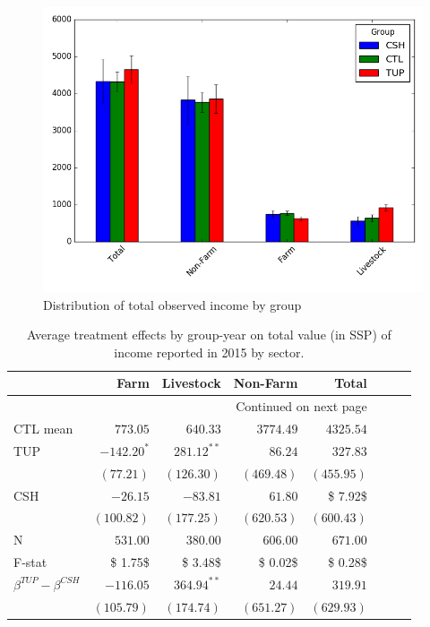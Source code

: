 \documentclass[12pt,article]{article}
\begin{document}
\begin{figure}[htb]
\centering
\includegraphics[width=.9\linewidth]{../figures/Income_group.png}
\caption{\label{fig:Income_group}Distribution of total observed income by group}
\end{figure} 



\begin{longtable}{lrrrrrrr}
\caption{\label{tab:Income}Average treatment effects by group-year on total value (in SSP) of income reported in 2015 by sector.}
\\
\hline
 & Farm & Livestock & Non-Farm & Total\\
\hline
\endhead
\hline\multicolumn{5}{r}{Continued on next page} \\
\endfoot
\endlastfoot
CTL mean & $773.05$ & $640.33$ & $3774.49$ & $4325.54$\\
\hline
TUP & $-142.20^{*}$ & $281.12^{**}$ & $86.24$ & $327.83$\\
 & $(77.21)$ & $(126.30)$ & $(469.48)$ & $(455.95)$\\
CSH & $-26.15$ & $-83.81$ & $61.80$ & \$ 7.92\$\\
 & $(100.82)$ & $(177.25)$ & $(620.53)$ & $(600.43)$\\
\hline
N & $531.00$ & $380.00$ & $606.00$ & $671.00$\\
F-stat & \$ 1.75\$ & \$ 3.48\$ & \$ 0.02\$ & \$ 0.28\$\\
\hline
$\beta^{TUP}-\beta^{CSH}$ & $-116.05$ & $364.94^{**}$ & $24.44$ & $319.91$\\
 & $(105.79)$ & $(174.74)$ & $(651.27)$ & $(629.93)$\\
\hline
\end{longtable}
\end{document}
